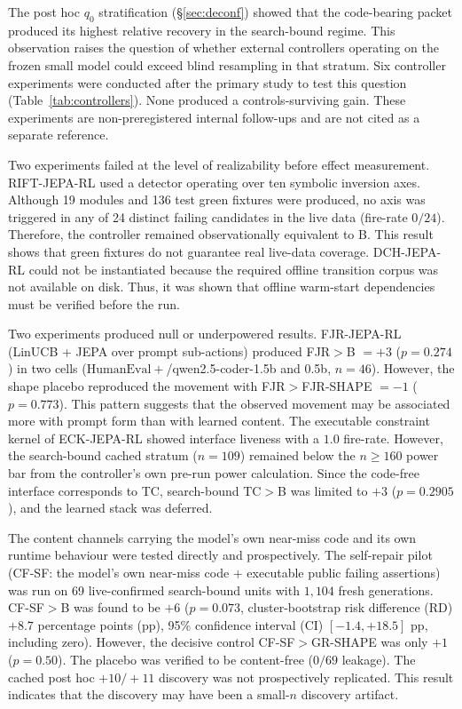 \documentclass{article}
\numberwithin{equation}{section}  %
\theoremstyle{definition}
\newcommand{\armB}{\textsf{B}}
\newcommand{\armTC}{\textsf{TC}}
\newcommand{\armCF}{\textsf{CF-SF}}
\newcommand{\armGR}{\textsf{GR-SHAPE}}
\begin{document}
The post hoc $q_0$ stratification (\S\ref{sec:deconf}) showed that the code-bearing packet
produced its highest relative recovery in the search-bound regime. This observation raises the
question of whether external controllers operating on the frozen small model could exceed
blind resampling in that stratum. Six controller experiments were conducted after the primary
study to test this question (Table~\ref{tab:controllers}). None produced a controls-surviving
gain. These experiments are non-preregistered internal follow-ups and are not cited as a
separate reference.

Two experiments failed at the level of realizability before effect measurement. RIFT-JEPA-RL
used a detector operating over ten symbolic inversion axes. Although 19 modules and 136 test
green fixtures were produced, no axis was triggered in any of 24 distinct failing candidates
in the live data (fire-rate $0/24$). Therefore, the controller remained observationally
equivalent to \armB{}. This result shows that green fixtures do not guarantee real live-data
coverage. DCH-JEPA-RL could not be instantiated because the required offline transition corpus
was not available on disk. Thus, it was shown that offline warm-start dependencies must be
verified before the run.

Two experiments produced null or underpowered results. FJR-JEPA-RL (LinUCB + JEPA over prompt
sub-actions) produced FJR$>$\armB{} $=+3$ ($p{=}0.274$) in two cells
($\mathrm{HumanEval}{+}$/qwen2.5-coder-1.5b and 0.5b, $n{=}46$). However, the shape placebo
reproduced the movement with FJR$>$FJR-SHAPE $=-1$ ($p{=}0.773$). This pattern suggests that
the observed movement may be associated more with prompt form than with learned content. The
executable constraint kernel of ECK-JEPA-RL showed interface liveness with a $1.0$ fire-rate.
However, the search-bound cached stratum ($n{=}109$) remained below the $n{\ge}160$ power bar
from the controller's own pre-run power calculation. Since the code-free interface corresponds
to \armTC{}, search-bound \armTC{}$>$\armB{} was limited to $+3$ ($p{=}0.2905$), and the
learned stack was deferred.

The content channels carrying the model's own near-miss code and its own runtime behaviour
were tested directly and prospectively. The self-repair pilot
(\armCF{}: the model's own near-miss code + executable public failing assertions) was run on
69 live-confirmed search-bound units with $1{,}104$ fresh generations. \armCF{}$>$\armB{}
was found to be $+6$ ($p{=}0.073$, cluster-bootstrap risk difference (RD) $+8.7$ percentage
points (pp), 95\% confidence interval (CI) $[-1.4,+18.5]$ pp, including zero). However, the
decisive control \armCF{}$>$\armGR{} was only $+1$ ($p{=}0.50$). The placebo was verified to
be content-free ($0/69$ leakage). The cached post hoc $+10/+11$ discovery was not
prospectively replicated. This result indicates that the discovery may have been a small-$n$
discovery artifact.
\end{document}

